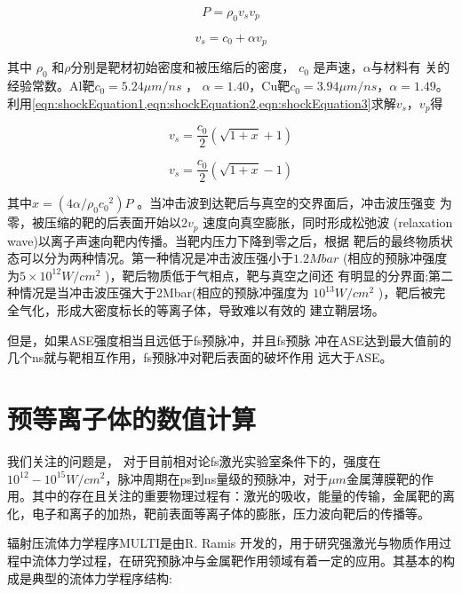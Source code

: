 \begin{equation}
\label{eqn:shockEquation2}
P= \rho_0 v_s  v_p
\end{equation}     

\begin{equation}
\label{eqn:shockEquation3}
v_s = c_0 + \alpha v_p
\end{equation}     

其中 $\rho_0$ 和$\rho$分别是靶材初始密度和被压缩后的密度， $c_0$ 是声速，$\alpha$与材料有
关的经验常数。Al靶$c_0=5.24 \mu m/ns$ ， $\alpha=1.40$，Cu靶$c_0=3.94 \mu m/ns$，$\alpha=1.49$\cite{lundh2007influence}。利用\ref{eqn:shockEquation1,eqn:shockEquation2,eqn:shockEquation3}求解$v_s$，$v_p$得

\begin{equation}
\label{eqn:shockV}
v_s = \frac{c_0}{2} (\sqrt{1+x}+1)
\end{equation} 

\begin{equation}
\label{eqn:pressureV}
v_s = \frac{c_0}{2}(\sqrt{1+x}-1)
\end{equation} 


其中$x=(4 \alpha / {\rho}_0 {c_0}^2)P$ 。当冲击波到达靶后与真空的交界面后，冲击波压强变
为零，被压缩的靶的后表面开始以$2v_p$ 速度向真空膨胀，同时形成松弛波
(relaxation wave)以离子声速向靶内传播。当靶内压力下降到零之后，根据
靶后的最终物质状态可以分为两种情况。第一种情况是冲击波压强小于$1.2Mbar$
(相应的预脉冲强度为$5 \times {10}^{12}W/{cm}^2$ )，靶后物质低于气相点，靶与真空之间还
有明显的分界面;第二种情况是当冲击波压强大于2Mbar(相应的预脉冲强度为
${10}^{13}W/{cm}^2$ )，靶后被完全气化，形成大密度标长的等离子体，导致难以有效的
建立鞘层场\cite{batani2010effects}。

但是，如果ASE强度相当且远低于fs预脉冲，并且fs预脉
冲在ASE达到最大值前的几个ns就与靶相互作用，fs预脉冲对靶后表面的破坏作用
远大于ASE。




\section{预等离子体的数值计算}


我们关注的问题是， 对于目前相对论fs激光实验室条件下的，强度在$10^{12}-10^{15} W/cm^2$，脉冲周期在ps到ns量级的预脉冲，对于$\mu m$金属薄膜靶的作用。其中的存在且关注的重要物理过程有：激光的吸收，能量的传输，金属靶的离化，电子和离子的加热，靶前表面等离子体的膨胀，压力波向靶后的传播等。


辐射压流体力学程序MULTI是由R. Ramis 开发的，用于研究强激光与物质作用过程中流体力学过程，在研究预脉冲与金属靶作用领域有着一定的应用。其基本的构成是典型的流体力学程序结构:


